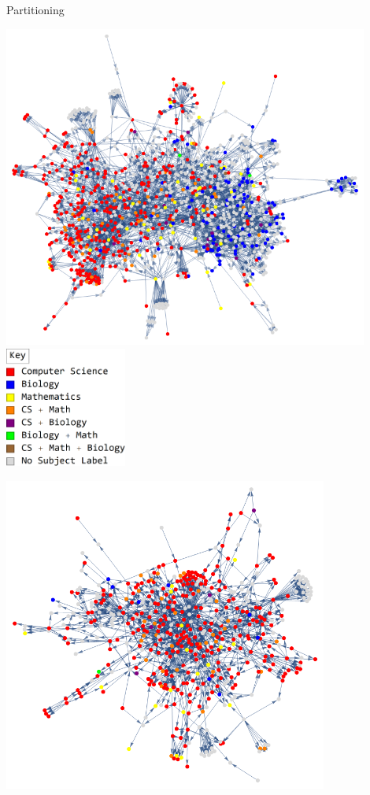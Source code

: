 \documentclass[xcolor=dvipsnames, 14pt]{beamer}
\begin{document}
\begin{frame}{Partitioning}
\centering
\begin{minipage}{0.55\linewidth}
\includegraphics[width=0.9\textwidth]{color_coded_full.png}
\includegraphics[width=0.3\textwidth]{color_key.png}
\end{minipage}\hfill
\begin{minipage}{0.4\linewidth}
\includegraphics[width=0.8\textwidth]{color_coded_left.png}

\end{minipage}
\end{frame}
\end{document}
